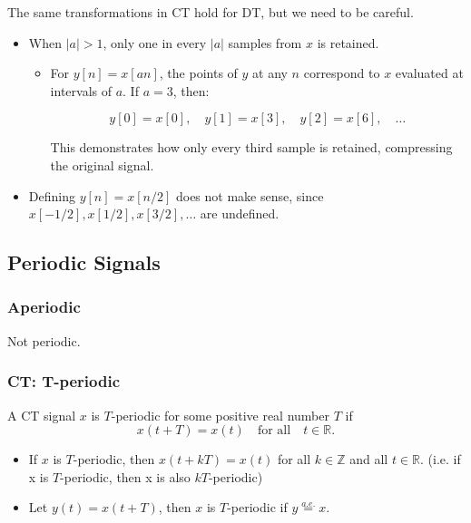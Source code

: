    \begin{warning}
        The same transformations in CT hold for DT, but we need to be careful. 
        \begin{itemize}
            \item When $|a|>1$, only one in every $|a|$ samples from $x$ is retained.
            \begin{itemize}
                \item For \(y[n] = x[an]\), the points of \(y\) at any \(n\) correspond to \(x\) evaluated at intervals of \(a\). If \(a = 3\), then:

                \[
                y[0] = x[0], \quad y[1] = x[3], \quad y[2] = x[6], \quad \dots
                \]
                
                This demonstrates how only every third sample is retained, compressing the original signal.
            \end{itemize}
            
            \item Defining $y[n] = x[n/2]$ does not make sense, since $x[-1/2], x[1/2],x[3/2],\ldots$ are undefined.
        \end{itemize}    
    \end{warning}

\subsection{Periodic Signals}
    \subsubsection{Aperiodic}
    \begin{definition}
        Not periodic.
    \end{definition}
    
    \subsubsection{CT: T-periodic}
    \begin{definition}
        A CT signal \(x\) is $T$-periodic for some positive real number \(T\) if
        \begin{equation}
            x(t + T) = x(t) \quad \text{for all} \quad t \in \mathbb{R}.
        \end{equation}

        \begin{itemize}
            \item If $x$ is $T$-periodic, then \(x(t + kT) = x(t)\) for all \(k \in \mathbb{Z}\) and all \(t \in \mathbb{R}\). (i.e. if x is $T$-periodic, then x is also $kT$-periodic)
            \item Let \(y(t) = x(t + T)\), then \(x\) is \(T\)-periodic if $y \overset{a.e.}{=} x$.
        \end{itemize}
    \end{definition}

